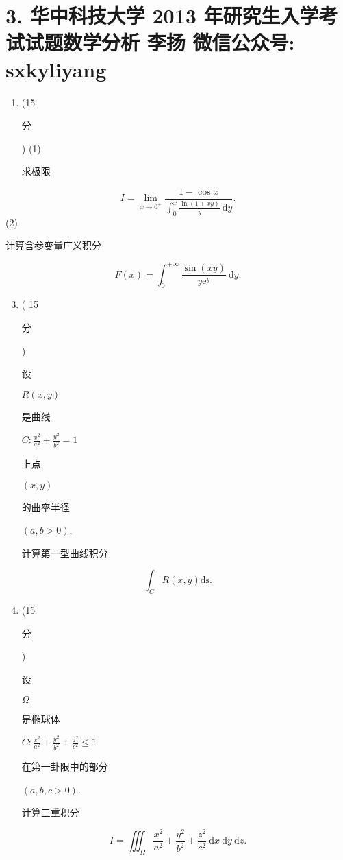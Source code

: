 \documentclass[10pt]{article}
\begin{document}
\section{3. 华中科技大学 2013 年研究生入学考试试题数学分析 
 李扬 
 微信公众号: sxkyliyang}
\begin{enumerate}
  \item (15 \begin{CJK}{UTF8}{mj}分\end{CJK}) (1) \begin{CJK}{UTF8}{mj}求极限\end{CJK}
\end{enumerate}
$$
I=\lim _{x \rightarrow 0^{+}} \frac{1-\cos x}{\int_{0}^{x} \frac{\ln (1+x y)}{y} \mathrm{~d} y} .
$$
(2) \begin{CJK}{UTF8}{mj}计算含参变量广义积分\end{CJK}
$$
F(x)=\int_{0}^{+\infty} \frac{\sin (x y)}{y \mathrm{e}^{y}} \mathrm{~d} y .
$$

\begin{enumerate}
  \setcounter{enumi}{2}
  \item ( 15 \begin{CJK}{UTF8}{mj}分\end{CJK}) \begin{CJK}{UTF8}{mj}设\end{CJK} $R(x, y)$ \begin{CJK}{UTF8}{mj}是曲线\end{CJK} $C: \frac{x^{2}}{a^{2}}+\frac{y^{2}}{b^{2}}=1$ \begin{CJK}{UTF8}{mj}上点\end{CJK} $(x, y)$ \begin{CJK}{UTF8}{mj}的曲率半径\end{CJK} $(a, b>0)$, \begin{CJK}{UTF8}{mj}计算第一型曲线积分\end{CJK}
\end{enumerate}
$$
\int_{C} R(x, y) \mathrm{ds} .
$$

\begin{enumerate}
  \setcounter{enumi}{3}
  \item (15 \begin{CJK}{UTF8}{mj}分\end{CJK}) \begin{CJK}{UTF8}{mj}设\end{CJK} $\Omega$ \begin{CJK}{UTF8}{mj}是椭球体\end{CJK} $C: \frac{x^{2}}{a^{2}}+\frac{y^{2}}{b^{2}}+\frac{z^{2}}{c^{2}} \leq 1$ \begin{CJK}{UTF8}{mj}在第一卦限中的部分\end{CJK} $(a, b, c>0)$. \begin{CJK}{UTF8}{mj}计算三重积分\end{CJK}
\end{enumerate}
$$
I=\iiint_{\Omega} \frac{x^{2}}{a^{2}}+\frac{y^{2}}{b^{2}}+\frac{z^{2}}{c^{2}} \mathrm{~d} x \mathrm{~d} y \mathrm{~d} z .
$$
\end{document}
